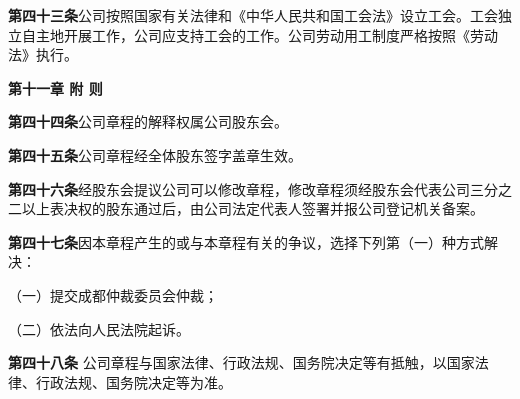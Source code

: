 \textbf{第四十三条}\quad   公司按照国家有关法律和《中华人民共和国工会法》设立工会。工会独立自主地开展工作，公司应支持工会的工作。公司劳动用工制度严格按照《劳动法》执行。


\begin{center}
\textbf{第十一章 \quad  附  则}
\end{center}

\textbf{第四十四条}\quad  公司章程的解释权属公司股东会。

\textbf{第四十五条}\quad  公司章程经全体股东签字盖章生效。

\textbf{第四十六条}\quad   经股东会提议公司可以修改章程，修改章程须经股东会代表公司三分之二以上表决权的股东通过后，由公司法定代表人签署并报公司登记机关备案。

\textbf{第四十七条}\quad  因本章程产生的或与本章程有关的争议，选择下列第（一）种方式解决：

（一）提交成都仲裁委员会仲裁；

   （二）依法向人民法院起诉。

\textbf{第四十八条 }\quad 公司章程与国家法律、行政法规、国务院决定等有抵触，以国家法律、行政法规、国务院决定等为准。

\vskip 2cm


